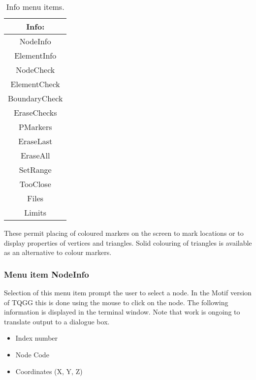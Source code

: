 \documentclass{article}
\begin{document}
\begin{table}[htb!]
 \caption{Info menu items.}
  \begin{center}
   \begin{tabular}{|c|}
    \hline
Info:\\     \hline
NodeInfo \\ ElementInfo \\     \hline
NodeCheck \\ ElementCheck \\ BoundaryCheck \\ EraseChecks \\     \hline
PMarkers \\ EraseLast \\ EraseAll \\     \hline
SetRange \\ TooClose \\     \hline
Files \\ Limits \\
    \hline
   \end{tabular}
   \label{tab:INFO}
  \end{center}
\end{table}

These permit placing of coloured markers on the screen to mark locations or to display properties of vertices and triangles. Solid colouring of triangles is available as an alternative to colour markers.


\subsubsection{Menu item NodeInfo}
Selection of this menu item prompt the user to select a node.  In the Motif version of TQGG this is done using the mouse to click on the node.  The following information is displayed in the terminal window.  Note that work is ongoing to translate output to a dialogue box.

\begin{itemize}
\item Index number
\item Node Code
\item Coordinates (X, Y, Z)
\end{itemize}
\end{document}
